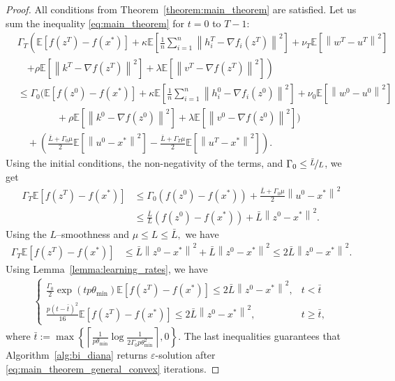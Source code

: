 \documentclass{article} %
\newcommand{\norm}[1]{\left\| #1 \right\|}
\newcommand{\Exp}[1]{{\mathbb{E}}\left[#1\right]}
\theoremstyle{plain}
\theoremstyle{definition}
\theoremstyle{remark}
\newcommand{\eqdef}{:=}
\begin{document}
\begin{proof}
All conditions from Theorem~\ref{theorem:main_theorem} are satisfied. Let us sum the inequality \eqref{eq:main_theorem} for $t = 0$ to $T - 1:$
\begin{align*}
  &\Gamma_{T}\left(\Exp{f(z^{T}) - f(x^*)} + \kappa \Exp{\frac{1}{n}\sum_{i=1}^n \norm{h_i^{T} - \nabla f_i(z^{T})}^2} + \nu_{T} \Exp{\norm{w^{T} - u^{T}}^2}\right.\\
    &\quad  \left.+ \rho \Exp{\norm{k^{T} - \nabla f(z^{T})}^2} + \lambda \Exp{\norm{v^{T} - \nabla f(z^{T})}^2}\right)\\
    &\leq \Gamma_{0} \Bigg( \Exp{f(z^{0}) - f(x^*)} + \kappa \Exp{\frac{1}{n}\sum_{i=1}^n \norm{h_i^0 - \nabla f_i(z^{0})}^2}  + \nu_{0} \Exp{\norm{w^0 - u^0}^2} \\
    &\qquad\qquad + \rho \Exp{\norm{k^{0} - \nabla f(z^0)}^2} + \lambda \Exp{\norm{v^{0} - \nabla f(z^0)}^2} \Bigg)\\
    &\quad+ \left(\frac{\bar{L} + \Gamma_{0} \mu}{2} \Exp{\norm{u^0 - x^*}^2} - \frac{\bar{L} + \Gamma_{T} \mu}{2} \Exp{\norm{u^{T} - x^*}^2}\right).
\end{align*}
Using the initial conditions, the non-negativity of the terms, and $\Gamma_0 \leq \nicefrac{\bar{L}}{L}$, we get
\begin{align*}
  \Gamma_{T}\Exp{f(z^{T}) - f(x^*)} &\leq \Gamma_{0} \left(f(z^{0}) - f(x^*)\right) + \frac{\bar{L} + \Gamma_{0} \mu}{2} \norm{u^0 - x^*}^2 \\
  &\leq \frac{\bar{L}}{L}\left(f(z^{0}) - f(x^*)\right) + \bar{L} \norm{z^0 - x^*}^2.
\end{align*}
Using the $L$--smoothness and $\mu \leq L \leq \bar{L},$ we have
\begin{align*}
  \Gamma_{T}\Exp{f(z^{T}) - f(x^*)} &\leq \bar{L} \norm{z^0 - x^*}^2 + \bar{L} \norm{z^0 - x^*}^2 \leq 2\bar{L} \norm{z^0 - x^*}^2.
\end{align*}
Using Lemma~\ref{lemma:learning_rates}, we have
\begin{align*}
  \begin{cases}
    \frac{\Gamma_0}{2} \exp \left(t p \theta_{\min}\right) \Exp{f(z^{T}) - f(x^*)} \leq 2\bar{L} \norm{z^0 - x^*}^2, &t < \bar{t} \\
    \frac{p (t - \bar{t})^2}{16} \Exp{f(z^{T}) - f(x^*)} \leq 2\bar{L} \norm{z^0 - x^*}^2, &t \geq \bar{t},
  \end{cases}
\end{align*}
where $\bar{t} \eqdef \max\left\{\left\lceil\frac{1}{p \theta_{\min}} \log \frac{1}{2 \Gamma_0 p \theta_{\min}^2}\right\rceil, 0\right\}.$ The last inequalities guarantees that Algorithm~\ref{alg:bi_diana} returns $\varepsilon$-solution after \eqref{eq:main_theorem_general_convex}
iterations.

\end{proof}
\end{document}
